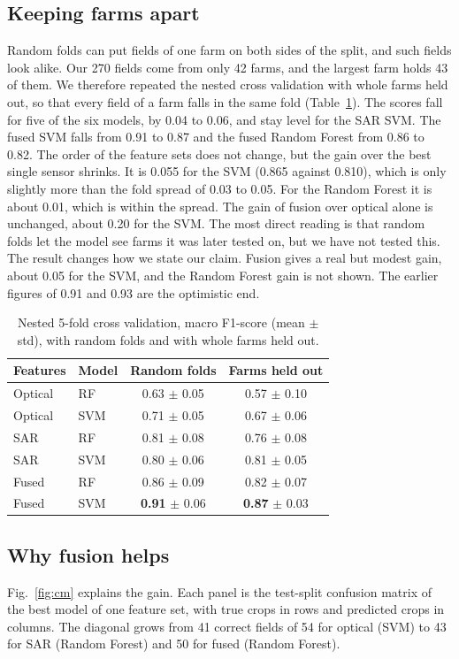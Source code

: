 \documentclass[conference]{IEEEtran}
\begin{document}
\subsection{Keeping farms apart}
\label{sec:farm}
Random folds can put fields of one farm on both sides of the split, and such fields look alike. Our 270 fields come from only 42 farms, and the largest farm holds 43 of them. We therefore repeated the nested cross validation with whole farms held out, so that every field of a farm falls in the same fold (Table~\ref{tab:farm}). The scores fall for five of the six models, by 0.04 to 0.06, and stay level for the SAR SVM. The fused SVM falls from 0.91 to 0.87 and the fused Random Forest from 0.86 to 0.82. The order of the feature sets does not change, but the gain over the best single sensor shrinks. It is 0.055 for the SVM (0.865 against 0.810), which is only slightly more than the fold spread of 0.03 to 0.05. For the Random Forest it is about 0.01, which is within the spread. The gain of fusion over optical alone is unchanged, about 0.20 for the SVM. The most direct reading is that random folds let the model see farms it was later tested on, but we have not tested this. The result changes how we state our claim. Fusion gives a real but modest gain, about 0.05 for the SVM, and the Random Forest gain is not shown. The earlier figures of 0.91 and 0.93 are the optimistic end.

\begin{table}[t]
\caption{Nested 5-fold cross validation, macro F1-score (mean $\pm$ std), with random folds and with whole farms held out.}
\label{tab:farm}
\centering
\footnotesize
\setlength{\tabcolsep}{3.5pt}
\begin{tabular}{llcc}
\toprule
Features & Model & Random folds & Farms held out\\
\midrule
Optical & RF  & 0.63 $\pm$ 0.05 & 0.57 $\pm$ 0.10\\
Optical & SVM & 0.71 $\pm$ 0.05 & 0.67 $\pm$ 0.06\\
SAR     & RF  & 0.81 $\pm$ 0.08 & 0.76 $\pm$ 0.08\\
SAR     & SVM & 0.80 $\pm$ 0.06 & 0.81 $\pm$ 0.05\\
Fused   & RF  & 0.86 $\pm$ 0.09 & 0.82 $\pm$ 0.07\\
Fused   & SVM & \textbf{0.91} $\pm$ 0.06 & \textbf{0.87} $\pm$ 0.03\\
\bottomrule
\end{tabular}
\end{table}

\subsection{Why fusion helps}
Fig.~\ref{fig:cm} explains the gain. Each panel is the test-split confusion matrix of the best model of one feature set, with true crops in rows and predicted crops in columns. The diagonal grows from 41 correct fields of 54 for optical (SVM) to 43 for SAR (Random Forest) and 50 for fused (Random Forest).
\end{document}
